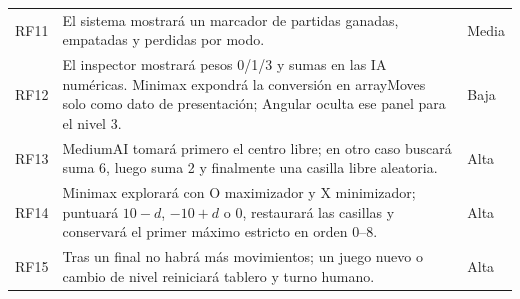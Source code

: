 \documentclass[12pt,a4paper]{article}
\begin{document}
\begin{longtable}{p{1.3cm}p{9.2cm}p{2.6cm}}
RF11 & El sistema mostrará un marcador de partidas ganadas, empatadas y perdidas por modo. & Media\\
RF12 & El inspector mostrará pesos 0/1/3 y sumas en las IA numéricas. Minimax expondrá la conversión en arrayMoves solo como dato de presentación; Angular oculta ese panel para el nivel 3. & Baja\\
RF13 & MediumAI tomará primero el centro libre; en otro caso buscará suma 6, luego suma 2 y finalmente una casilla libre aleatoria. & Alta\\
RF14 & Minimax explorará con O maximizador y X minimizador; puntuará $10-d$, $-10+d$ o 0, restaurará las casillas y conservará el primer máximo estricto en orden 0--8. & Alta\\
RF15 & Tras un final no habrá más movimientos; un juego nuevo o cambio de nivel reiniciará tablero y turno humano. & Alta\\
\bottomrule
\end{longtable}
\end{document}
